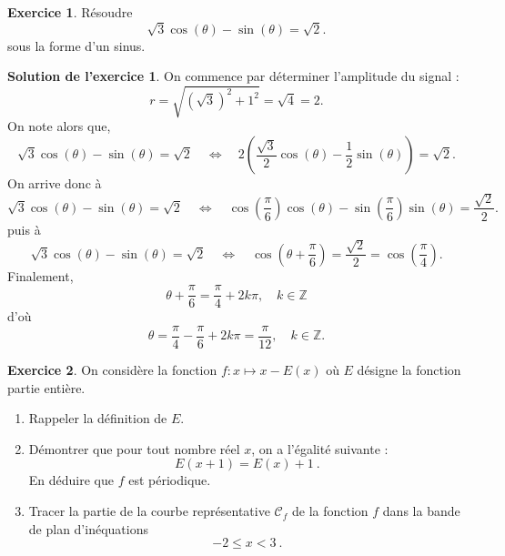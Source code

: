 \documentclass[a4paper, 11pt,openany]{article}%
\theoremstyle{plain}
\theoremstyle{definition}
\newtheorem{exo}{Exercice}
\newtheorem{sol}{Solution de l'exercice}
\theoremstyle{remark}
\newcommand{\Z}{\mathbb{Z}}
\begin{document}
\begin{exo}
Résoudre 
\[ \sqrt{3} \cos(\theta) -  \sin (\theta) = \sqrt{2}.\]
sous la forme d'un sinus.
\end{exo}
%
\begin{sol}
On commence par déterminer l'amplitude du signal :
\[ r = \sqrt{(\sqrt{3})^2 + 1^2} = \sqrt{4} = 2.\]
On note alors que,
\[ \sqrt{3} \cos(\theta) -  \sin (\theta) = \sqrt{2} \quad \Leftrightarrow \quad 2 \left( \frac{\sqrt{3}}{2} \cos(\theta) - \frac{1}{2} \sin (\theta) \right) = \sqrt{2}.\]
On arrive donc à
\[ \sqrt{3} \cos(\theta) -  \sin (\theta) = \sqrt{2} \quad \Leftrightarrow \quad  \cos \left( \frac{\pi}{6} \right)  \cos(\theta) -  \sin \left( \frac{\pi}{6} \right) \sin (\theta) = \frac{\sqrt{2}}{2}.\]
puis à
\[ \sqrt{3} \cos(\theta) -  \sin (\theta) = \sqrt{2} \quad \Leftrightarrow \quad  \cos \left(  \theta + \frac{\pi}{6} \right)  = \frac{\sqrt{2}}{2} = \cos \left( \frac{\pi}{4} \right).\]
Finalement,
\[ \theta + \frac{\pi}{6} = \frac{\pi}{4} + 2k \pi, \quad k \in \Z\]
d'où
\[ \theta = \frac{\pi}{4}  - \frac{\pi}{6} + 2k \pi = \frac{\pi}{12}, \quad k \in \Z.\]
\end{sol}

\begin{exo}
	On considère la fonction $f\colon x \mapsto x - E(x)$ où $E$ désigne la fonction partie entière.
	\begin{enumerate}
		\item Rappeler la définition de $E$.
		\item Démontrer que pour tout nombre réel $x$, on a l'égalité suivante :
		\[
			E(x+1)	= E(x) + 1 \ .
		\]
		En déduire que $f$ est périodique. 
		\item Tracer la partie de la courbe représentative $\mathcal{C}_f$ de la fonction $f$ dans la bande de plan d'inéquations
		\[
			-2 \leqslant x < 3 \ .
		\]
	\end{enumerate}
\end{exo}
\end{document}
